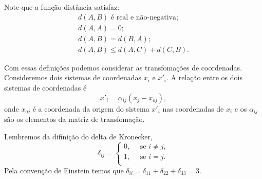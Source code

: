 Note que a fun\c{c}\~ao dist\^ancia satisfaz:
\begin{equation}
  \begin{array}{l}
            d(A,B) \mbox{ \'e real e n\~ao-negativa};\\
            d(A,A)=0;\\
             d(A,B)= d(B,A);\\
             d(A,B) \leq d(A,C)+ d(C,B).
\end{array}  
\end{equation}

Com essas defini\c{c}\~oes podemos considerar as
transfoma\c{c}\~oes de coordenadas. Consideremos dois sistemas de
 coordenadas $x_{i}$ e $x'_{i}$. A rela\c{c}\~ao entre os dois sistemas de coordenadas \'e
\begin{equation}
x'_{i}=\alpha_{ij}(x_{j}-x_{oj}),
\end{equation}
onde $x_{oj}$ \'e a coordenada da origem do sistema $x'_{i}$ nas coordenadas de
$x_{i}$ e os $\alpha_{ij}$ s\~ao os elementos da matriz de
transfoma\c{c}\~ao.

Lembremos da difini\c{c}\~ao do delta de Kronecker,
\begin{equation}
\delta_{ij}=\left \{ \begin{array}{l}
                0, \mbox{   }\mbox{   }\mbox{se } i \neq j,\\
                1, \mbox{   }\mbox{   }\mbox{se } i= j.\\
\end{array} \right.
\end{equation}
Pela conven\c{c}\~ao de Einstein temos que
$\delta_{ii}=\delta_{11}+\delta_{22}+\delta_{33}=3$.

